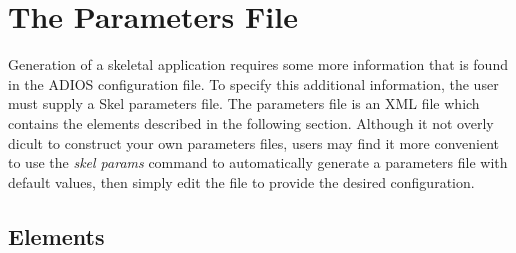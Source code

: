 \chapter{The Parameters File}
Generation of a skeletal application requires some more information that is
found in the ADIOS configuration file. To specify this additional information,
the user must supply a Skel parameters file. The parameters file is an XML file
which contains the elements described in the following section.
Although it not overly dicult to construct your own parameters files, users
may find it more convenient to use the {\it skel params} command to automatically
generate a parameters file with default values, then simply edit the file to provide
the desired configuration.
\section{Elements}
